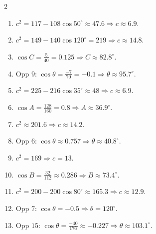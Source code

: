 \documentclass[11pt]{article}
\begin{document}
\begin{keybox}
\begin{multicols}{2}
\small
\begin{enumerate}[leftmargin=*,itemsep=3pt]
  \item $c^2=117-108\cos50^\circ\approx47.6\Rightarrow c\approx6.9$.
  \item $c^2=149-140\cos120^\circ=219\Rightarrow c\approx14.8$.
  \item $\cos C=\tfrac{5}{40}=0.125\Rightarrow C\approx82.8^\circ$.
  \item Opp $9$: $\cos\theta=\tfrac{-7}{70}=-0.1\Rightarrow\theta\approx95.7^\circ$.
  \item $c^2=225-216\cos35^\circ\approx48\Rightarrow c\approx6.9$.
  \item $\cos A=\tfrac{128}{160}=0.8\Rightarrow A\approx36.9^\circ$.
  \item $c^2\approx201.6\Rightarrow c\approx14.2$.
  \item Opp $6$: $\cos\theta\approx0.757\Rightarrow\theta\approx40.8^\circ$.
  \item $c^2=169\Rightarrow c=13$.
  \item $\cos B=\tfrac{32}{112}\approx0.286\Rightarrow B\approx73.4^\circ$.
  \item $c^2=200-200\cos80^\circ\approx165.3\Rightarrow c\approx12.9$.
  \item Opp $7$: $\cos\theta=-0.5\Rightarrow\theta=120^\circ$.
  \item Opp $15$: $\cos\theta=\tfrac{-40}{176}\approx-0.227\Rightarrow\theta\approx103.1^\circ$.
\end{enumerate}
\end{multicols}
\end{keybox}
\end{document}
